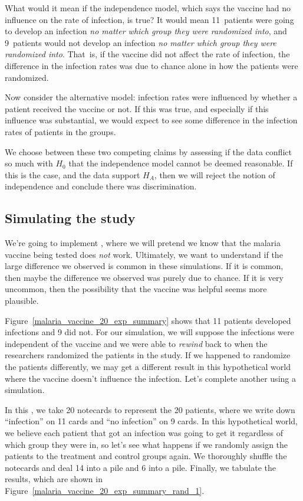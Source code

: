 What would it mean if the independence model,
which says the vaccine had no influence on the
rate of infection, is true?
It would mean 11~patients were going to
develop an infection \emph{no matter which group
they were randomized into},
and 9~patients would not develop an infection
\emph{no matter which group they were randomized
into}.
That~is, if the vaccine did not affect the rate
of infection, the difference in the infection rates
was due to chance alone in how the patients were
randomized.

Now consider the alternative model:
infection rates were influenced by whether a patient
received the vaccine or not.
If this was true, and especially if this influence
was substantial, we would expect to see some difference
in the infection rates of patients in the groups.

We choose between these two competing claims
by assessing if the data conflict so much with
$H_0$ that the independence model cannot be deemed
reasonable.
If this is the case, and the data support $H_A$,
then we will reject the notion of independence
and conclude there was discrimination.


\subsection{Simulating the study}
\label{simulatingTheStudy}

We're going to implement
,
where we will pretend we know that the malaria
vaccine being tested does \emph{not} work.
Ultimately, we want to understand if the large
difference we observed is common in these
simulations.
If it is common, then maybe the difference
we observed was purely due to chance.
If it is very uncommon, then the possibility
that the vaccine was helpful seems more plausible.

Figure~\ref{malaria_vaccine_20_exp_summary}
shows that 11 patients developed infections and 9 did not.
For our simulation, we will suppose the infections
were independent of the vaccine and we were able to
\emph{rewind} back to when the researchers randomized
the patients in the study.
If we happened to randomize the patients differently,
we may get a different result in this hypothetical
world where the vaccine doesn't influence the infection.
Let's complete another  using
a simulation.

In this , we take 20 notecards to
represent the 20 patients, where we write down ``infection''
on 11 cards and ``no infection'' on 9 cards.
In this hypothetical world, we believe each patient
that got an infection was going to get it regardless
of which group they were in, so let's see what happens
if we randomly assign the patients to the treatment
and control groups again.
We thoroughly shuffle the notecards and deal 14 into
a  pile and 6 into a  pile.
Finally, we tabulate the results, which are shown in
Figure~\ref{malaria_vaccine_20_exp_summary_rand_1}.

